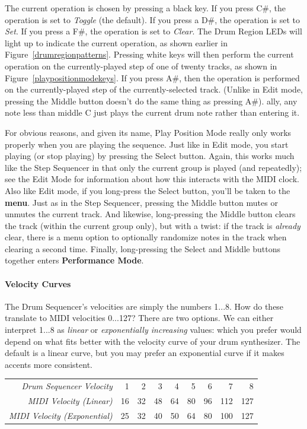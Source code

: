 \documentclass{article}
\begin{document}
The current operation is chosen by  pressing a black key.  If you press C\#, the operation is set to {\it Toggle} (the default).  If you press a D\#, the operation is set to {\it Set}.  If you press a F\#, the operation is set to {\it Clear}.  The Drum Region LEDs will light up to indicate the current operation, as shown earlier in Figure~\ref{drumregionpatterns}.  Pressing white keys will then perform the current operation on the currently-played step of one of twenty tracks, as shown in Figure~\ref{playpositionmodekeys}.  If you press A\#, then the operation is performed on the currently-played step of the currently-selected track.  (Unlike in Edit mode, pressing the Middle button doesn't do the same thing as pressing A\#).  ally, any note less than middle C just plays the current drum note rather than entering it.

For obvious reasons, and given its name, Play Position Mode really only works properly when you are playing the sequence.  Just like in Edit mode, you start playing (or stop playing) by pressing the Select button.  Again, this works much like the Step Sequencer in that only the current group is played (and repeatedly); see the Edit Mode for information about how this interacts with the MIDI clock.   Also like Edit mode, if you long-press the Select button, you'll be taken to the {\bf menu}.    Just as in the Step Sequencer, pressing the Middle button mutes or unmutes the current track.    And likewise, long-pressing the Middle button clears the track (within the current group only), but with a twist: if the track is {\it already} clear, there is a menu option to optionally randomize notes in the track when clearing a second time.  Finally, long-pressing the Select and Middle buttons together enters {\bf Performance Mode}.

\paragraph{Velocity Curves}  The Drum Sequencer's velocities are simply the numbers 1...8.  How do these translate to MIDI velocities 0...127?  There are two options.  We can either interpret 1...8 as {\it linear} or {\it exponentially increasing} values: which you prefer would depend on what fits better with the velocity curve of your drum synthesizer.  The default is a linear curve, but you may prefer an exponential curve if it makes accents more consistent. 

{\small
\begin{center}\begin{tabular}{r|rrrrrrrr}
\it Drum Sequencer Velocity& 1 & 2 & 3 & 4 & 5 & 6 & 7 & 8\\
\it MIDI Velocity (Linear) & 16 & 32 & 48 & 64 & 80 & 96 & 112 & 127\\
\it MIDI Velocity (Exponential) & 25 & 32 & 40 & 50 & 64 & 80 & 100 & 127\\
\end{tabular}\end{center}
}
\end{document}
